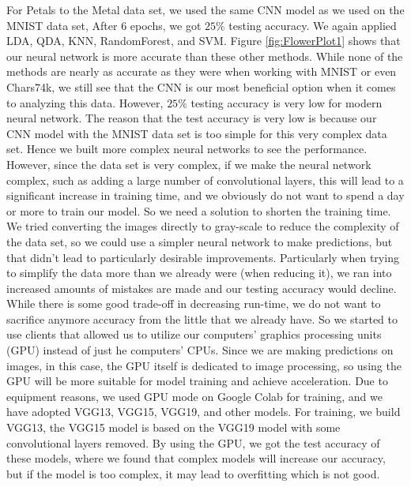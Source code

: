 \documentclass{article}
\begin{document}
\begin{multicols}{2}
For Petals to the Metal data set, we used the same CNN model as we used on the MNIST data set, After 6 epochs, we got $25\%$ testing accuracy. We again applied LDA, QDA, KNN, RandomForest, and SVM. Figure \ref{fig:FlowerPlot1} shows that our neural network is more accurate than these other methods. While none of the methods are nearly as accurate as they were when working with MNIST or even Chars74k, we still see that the CNN is our most beneficial option when it comes to analyzing this data. However, $25\%$ testing accuracy is very low for modern neural network. The reason that the test accuracy is very low is because our CNN model with the MNIST data set is too simple for this very complex data set. Hence we built more complex neural networks to see the performance. However, since the data set is very complex, if we make the neural network complex, such as adding a large number of convolutional layers, this will lead to a significant increase in training time, and we obviously do not want to spend a day or more to train our model. So we need a solution to shorten the training time. We tried converting the images directly to gray-scale to reduce the complexity of the data set, so we could use a simpler neural network to make predictions, but that didn't lead to particularly desirable improvements. Particularly when trying to simplify the data more than we already were (when reducing it), we ran into increased amounts of mistakes are made and our testing accuracy would decline. While there is some good trade-off in decreasing run-time, we do not want to sacrifice anymore accuracy from the little that we already have. So we started to use clients that allowed us to utilize our computers' graphics processing units (GPU) instead of just he computers' CPUs. Since we are making predictions on images, in this case, the GPU itself is dedicated to image processing, so using the GPU will be more suitable for model training and achieve acceleration. Due to equipment reasons, we used GPU mode on Google Colab for training, and we have adopted VGG13, VGG15, VGG19, and other models. For training, we build VGG13, the VGG15 model is based on the VGG19 model with some convolutional layers removed. By using the GPU, we got the test accuracy of these models, where we found that complex models will increase our accuracy, but if the model is too complex, it may lead to overfitting which is not good.
\end{multicols}
\end{document}
